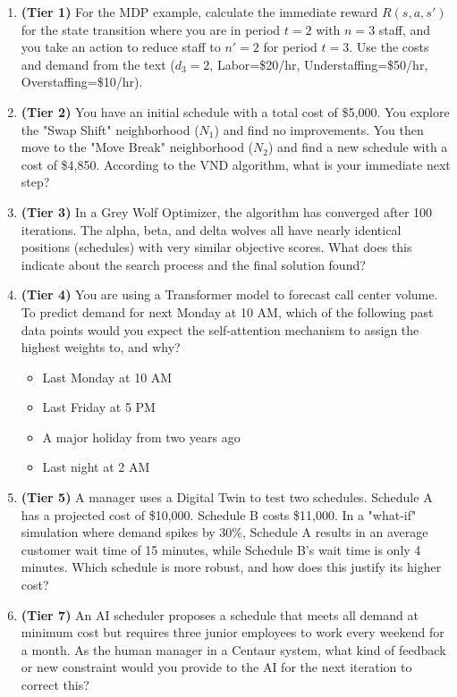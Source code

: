 \documentclass{article}
\begin{document}
\begin{enumerate}[label=\textbf{Q\arabic*:}, wide, labelsep=5pt]
    \item \textbf{(Tier 1)} For the MDP example, calculate the immediate reward $R(s, a, s')$ for the state transition where you are in period $t=2$ with $n=3$ staff, and you take an action to reduce staff to $n'=2$ for period $t=3$. Use the costs and demand from the text ($d_3=2$, Labor=\$20/hr, Understaffing=\$50/hr, Overstaffing=\$10/hr).

    \item \textbf{(Tier 2)} You have an initial schedule with a total cost of \$5,000. You explore the "Swap Shift" neighborhood ($N_1$) and find no improvements. You then move to the "Move Break" neighborhood ($N_2$) and find a new schedule with a cost of \$4,850. According to the VND algorithm, what is your immediate next step?

    \item \textbf{(Tier 3)} In a Grey Wolf Optimizer, the algorithm has converged after 100 iterations. The alpha, beta, and delta wolves all have nearly identical positions (schedules) with very similar objective scores. What does this indicate about the search process and the final solution found?

    \item \textbf{(Tier 4)} You are using a Transformer model to forecast call center volume. To predict demand for next Monday at 10 AM, which of the following past data points would you expect the self-attention mechanism to assign the highest weights to, and why?
    \begin{itemize}
        \item Last Monday at 10 AM
        \item Last Friday at 5 PM
        \item A major holiday from two years ago
        \item Last night at 2 AM
    \end{itemize}

    \item \textbf{(Tier 5)} A manager uses a Digital Twin to test two schedules. Schedule A has a projected cost of \$10,000. Schedule B costs \$11,000. In a "what-if" simulation where demand spikes by 30\%, Schedule A results in an average customer wait time of 15 minutes, while Schedule B's wait time is only 4 minutes. Which schedule is more robust, and how does this justify its higher cost?

    \item \textbf{(Tier 7)} An AI scheduler proposes a schedule that meets all demand at minimum cost but requires three junior employees to work every weekend for a month. As the human manager in a Centaur system, what kind of feedback or new constraint would you provide to the AI for the next iteration to correct this?


\end{enumerate}
\end{document}

